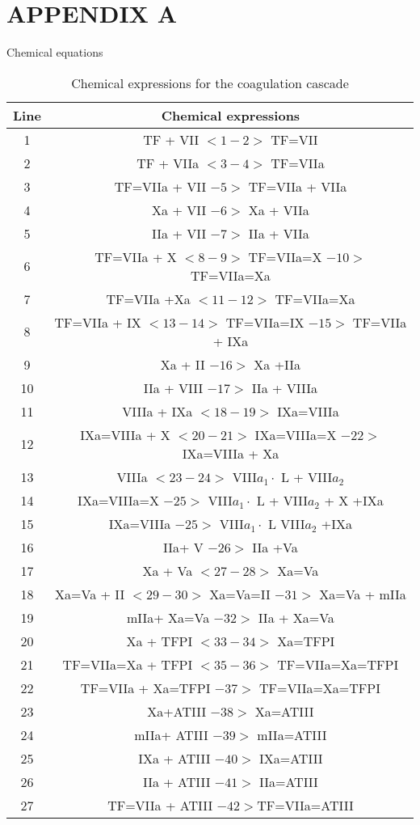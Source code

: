 \def\CTeXPreproc{Created by ctex v0.2.11, don't edit!}\begin{table}
\section*{APPENDIX A}
Chemical equations
\begin{center}
 \caption{Chemical expressions for the coagulation cascade}\label{taba}
 \vspace{3mm}
\begin{tabular}{|c|c|}\hline
Line&Chemical expressions\\\hline
  1& TF + VII $<1-2>$ TF=VII\\\hline
  2& TF + VIIa $<3-4>$ TF=VIIa\\\hline
 3 & TF=VIIa + VII $ -5>$ TF=VIIa + VIIa  \\\hline
 4 & Xa + VII $-6>$ Xa +
VIIa \\\hline
  5 & IIa + VII $-7>$ IIa + VIIa \\\hline
  6 &TF=VIIa + X  $<8-9>$ TF=VIIa=X $-10>$ TF=VIIa=Xa\\\hline
7 & TF=VIIa +Xa $<11-12>$ TF=VIIa=Xa\\\hline
 8 &TF=VIIa + IX $<13-14>$ TF=VIIa=IX $-15>$ TF=VIIa + IXa\\\hline
  9& Xa + II $-16>$ Xa +IIa \\\hline
  10& IIa + VIII $-17>$ IIa + VIIIa \\\hline
  11& VIIIa + IXa $<18-19>$ IXa=VIIIa \\\hline
  12 & IXa=VIIIa +  X $<20-21>$ IXa=VIIIa=X $-22>$ IXa=VIIIa +
  Xa\\\hline
13 & VIIIa $<23-24>$ VIII$a_1\cdot$ L +  VIII$a_2$\\\hline 14&
IXa=VIIIa=X $-25>$ VIII$a_1\cdot$ L + VIII$a_2$ + X +IXa\\\hline
 15& IXa=VIIIa $-25>$ VIII$a_1\cdot$ L VIII$a_2$ +IXa\\\hline
  16& IIa+ V $-26>$ IIa +Va\\\hline
   17 &Xa + Va $<27-28>$ Xa=Va \\\hline
   18& Xa=Va + II $<29-30>$ Xa=Va=II $-31>$ Xa=Va + mIIa\\\hline
    19& mIIa+ Xa=Va $-32>$ IIa + Xa=Va \\\hline
    20& Xa + TFPI $<33-34>$ Xa=TFPI \\\hline
    21& TF=VIIa=Xa + TFPI $<35-36>$ TF=VIIa=Xa=TFPI \\\hline
    22 & TF=VIIa + Xa=TFPI $-37>$ TF=VIIa=Xa=TFPI \\\hline
    23& Xa+ATIII $-38>$ Xa=ATIII\\\hline
     24& mIIa+ ATIII $-39>$ mIIa=ATIII\\\hline
      25& IXa + ATIII $-40>$ IXa=ATIII\\\hline
26& IIa + ATIII $-41>$ IIa=ATIII\\\hline
 27& TF=VIIa + ATIII $-42>$TF=VIIa=ATIII\\\hline
\end{tabular}


\end{center}
\end{table}
